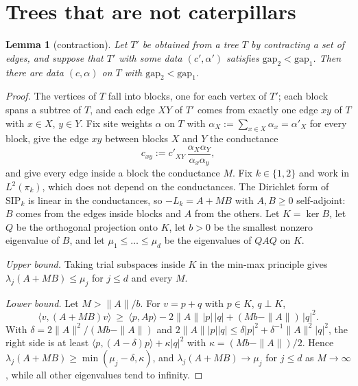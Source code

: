 \documentclass[11pt]{article}
\newtheorem{lemma}[theorem]{Lemma}
\theoremstyle{remark}
\newcommand{\gap}{\mathrm{gap}}
\begin{document}
\section{Trees that are not caterpillars}\label{sec:A}

\begin{lemma}[contraction]\label{lem:contract}
Let $T'$ be obtained from a tree $T$ by contracting a set of edges, and suppose that $T'$ with some data $(c',\alpha')$ satisfies $\gap_2<\gap_1$. Then there are data $(c,\alpha)$ on $T$ with $\gap_2<\gap_1$.
\end{lemma}

\begin{proof}
The vertices of $T$ fall into blocks, one for each vertex of $T'$; each block spans a subtree of $T$, and each edge $XY$ of $T'$ comes from exactly one edge $xy$ of $T$ with $x\in X$, $y\in Y$. Fix site weights $\alpha$ on $T$ with $\alpha_X:=\sum_{x\in X}\alpha_x=\alpha'_X$ for every block, give the edge $xy$ between blocks $X$ and $Y$ the conductance
\[
c_{xy}:=c'_{XY}\,\frac{\alpha_X\alpha_Y}{\alpha_x\alpha_y},
\]
and give every edge inside a block the conductance $M$. Fix $k\in\{1,2\}$ and work in $L^2(\pi_k)$, which does not depend on the conductances. The Dirichlet form of $\mathrm{SIP}_k$ is linear in the conductances, so $-L_k=A+MB$ with $A,B\ge0$ self-adjoint: $B$ comes from the edges inside blocks and $A$ from the others. Let $K=\ker B$, let $Q$ be the orthogonal projection onto $K$, let $b>0$ be the smallest nonzero eigenvalue of $B$, and let $\mu_1\le\dots\le\mu_d$ be the eigenvalues of $QAQ$ on $K$.

\emph{Upper bound.} Taking trial subspaces inside $K$ in the min-max principle gives $\lambda_j(A+MB)\le\mu_j$ for $j\le d$ and every $M$.

\emph{Lower bound.} Let $M>\|A\|/b$. For $v=p+q$ with $p\in K$, $q\perp K$,
\[
\langle v,(A+MB)v\rangle\ \ge\ \langle p,Ap\rangle-2\|A\|\,|p|\,|q|+(Mb-\|A\|)\,|q|^2 .
\]
With $\delta=2\|A\|^2/(Mb-\|A\|)$ and $2\|A\||p||q|\le\delta|p|^2+\delta^{-1}\|A\|^2|q|^2$, the right side is at least $\langle p,(A-\delta)p\rangle+\kappa|q|^2$ with $\kappa=(Mb-\|A\|)/2$. Hence $\lambda_j(A+MB)\ge\min(\mu_j-\delta,\kappa)$, and $\lambda_j(A+MB)\to\mu_j$ for $j\le d$ as $M\to\infty$, while all other eigenvalues tend to infinity.


\end{proof}
\end{document}
